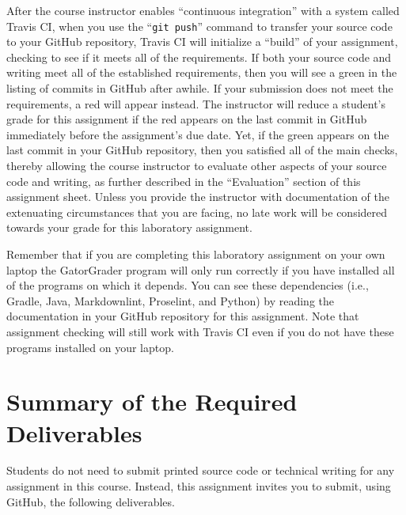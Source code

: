 \documentclass[11pt]{article}
\newcommand{\gitpush}{\command{git push}}
\newcommand{\command}[1]{``\lstinline{#1}''}
\newcommand{\step}[1]{``{#1}''}
\newcommand{\checkmark}{\ding{51}}
\newcommand{\naughtmark}{\ding{55}}
\begin{document}
After the course instructor enables \step{continuous integration} with a system
called Travis CI, when you use the \gitpush{} command to transfer your source
code to your GitHub repository, Travis CI will initialize a \step{build} of your
assignment, checking to see if it meets all of the requirements. If both your
source code and writing meet all of the established requirements, then you will
see a green \checkmark{} in the listing of commits in GitHub after awhile. If
your submission does not meet the requirements, a red \naughtmark{} will appear
instead. The instructor will reduce a student's grade for this assignment if the
red \naughtmark{} appears on the last commit in GitHub immediately before the
assignment's due date. Yet, if the green \checkmark{} appears on the last commit
in your GitHub repository, then you satisfied all of the main checks, thereby
allowing the course instructor to evaluate other aspects of your source code and
writing, as further described in the \step{Evaluation} section of this
assignment sheet. Unless you provide the instructor with documentation of the
extenuating circumstances that you are facing, no late work will be considered
towards your grade for this laboratory assignment.

Remember that if you are completing this laboratory assignment on your own
laptop the GatorGrader program will only run correctly if you have installed all
of the programs on which it depends. You can see these dependencies (i.e.,
Gradle, Java, Markdownlint, Proselint, and Python) by reading the documentation
in your GitHub repository for this assignment. Note that assignment checking
will still work with Travis CI even if you do not have these programs installed
on your laptop.


\section*{Summary of the Required Deliverables}

\noindent Students do not need to submit printed source code or technical
writing for any assignment in this course. Instead, this assignment invites you
to submit, using GitHub, the following deliverables.
\end{document}
